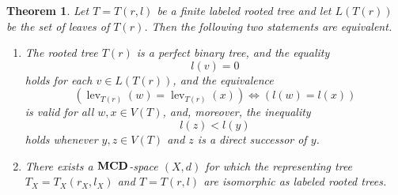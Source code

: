 \documentclass{raex}
\newtheorem{thm}{Theorem}[section]
\theoremstyle{definition}
\theoremstyle{remark}
\numberwithin{equation}{section}
\begin{document}
\begin{thm}\label{mmre}
Let $T=T(r,l)$ be a finite labeled rooted tree and let $L(T(r))$ be the set of leaves of $T(r)$.
Then the following two statements are equivalent.

\begin{enumerate}
\item[(i)]
The rooted tree $T(r)$ is a perfect binary tree, and the equality
\begin{equation}
    \label{ol1}
l(v)=0
\end{equation}
holds for each $v \in L(T(r))$, and the equivalence
\begin{equation}
    \label{td}
    \left( \operatorname{lev}_{T(r)}(w)=\operatorname{lev}_{T(r)}(x)\right) \iff     \left( l(w)=l(x)\right) 
\end{equation}
is valid for all $w,x\in V(T)$, and, moreover,
the inequality
\begin{equation}\label{fvhjj-1}
l(z)<l(y)
\end{equation}
holds whenever $y,z\in V(T)$ and $z$ is a direct successor of $y$.

\item[(ii)]
There exists a $ {\bf MCD}$-space $(X,d)$ for which the representing tree
\(
T_X=T_X( r_X,l_X)
\)
and
\(
T=T(r,l)
\)
are isomorphic as labeled rooted trees.
\end{enumerate}
\end{thm}
\end{document}
